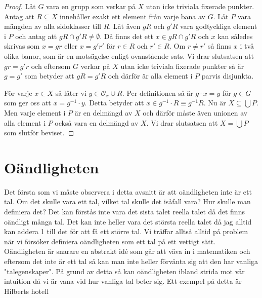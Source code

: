 \documentclass{article}
\newcommand{\orbit}[0]{\mathcal{O}}
\theoremstyle{definition}
\begin{document}
\hypertarget{lemma6.9.1}{}
\begin{proof}
  Låt $G$ vara en grupp som verkar på $X$ utan icke triviala fixerade punkter. Antag att $R \subseteq X$
  innehåller exakt ett element från varje bana av $G$. Låt $P$ vara mängden av alla sidoklasser till $R$. 
  Låt även $gR$ och $g'R$ vara godtyckliga element i $P$ och antag att $gR \cap g'R \neq \emptyset$. 
  Då finns det ett $x \in gR \cap g'R$ och $x$ kan således skrivas som $x = gr$ eller $x = g'r'$ för $r \in R$ och $r' \in R$. 
  Om $r \neq r'$ så finns $x$ i två olika banor, som är en motsägelse enligt ovanstående sats. Vi drar slutsatsen att $gr = g'r$
  och eftersom $G$ verkar på $X$ utan icke triviala fixerade punkter så är $g = g'$ som betyder att $gR = g'R$ och därför är alla element i $P$
  parvis disjunkta.

  För varje $x \in X$ så låter vi $y \in \orbit_x \cup R$. Per definitionen så är $g \cdot x = y$ för $g \in G$ som ger oss att 
  $x = g^{-1} \cdot y$. Detta betyder att $x \in g^{-1} \cdot R \equiv g^{-1}R$. Nu är $X \subseteq \bigcup P$. Men varje element i $P$ 
  är en delmängd av $X$ och därför måste även unionen av alla element i $P$ också vara en delmängd av $X$. Vi drar slutsatsen att $X = \bigcup P$
  som slutför beviset.
\end{proof}

\section{Oändligheten}
Det första som vi måste observera i detta avsnitt är att oändligheten inte är ett tal. Om det skulle vara ett tal, vilket tal skulle det isåfall vara?
Hur skulle man definiera det? Det kan förstås inte vara det sista talet reella talet då det finns oändligt många tal. 
Det kan inte heller vara det största reella talet då jag alltid kan addera 1 till det för att få ett större tal. Vi träffar alltså alltid på problem 
när vi försöker definiera oändligheten som ett tal på ett vettigt sätt. 
Oändligheten är snarare en abstrakt idé som går att väva in i matematiken och eftersom det inte är ett tal så kan man inte heller förvänta 
sig att den har vanliga "talegenskaper". På grund av detta så kan oändligheten ibland strida mot vår intuition då vi är vana vid hur vanliga tal 
beter sig. Ett exempel på detta är Hilberts hotell 
\end{document}
